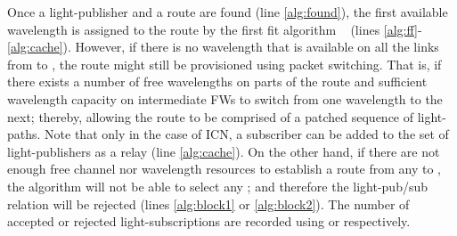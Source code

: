 \documentclass[journal]{IEEEtran}
\begin{document}
 Once a light-publisher  and a route  are found (line \ref{alg:found}), the first available wavelength is assigned to the route by the first fit algorithm ~\cite{raj:alloptic} (lines \ref{alg:ff}-\ref{alg:cache}).
 However, if there is no wavelength that is available on all the links from  to , the route might still be provisioned using packet switching. 
That is, if there exists a number of free wavelengths on parts of the route and sufficient wavelength capacity on intermediate FWs to switch from one wavelength to the next; thereby, allowing the route to be comprised of a patched sequence of light-paths. Note that only in the case of ICN, a subscriber can be added to the set of light-publishers as a relay (line \ref{alg:cache}). 
 On the other hand, if there are not enough free channel nor
 wavelength resources to establish a route from any  to ,
 the algorithm will not be able to select any ; and
 therefore the light-pub/sub relation will be rejected (lines
 \ref{alg:block1} or \ref{alg:block2}). The number of accepted or
 rejected light-subscriptions are recorded using  or  respectively.
\begin{algorithm}[t]
\caption{}
\label{alg:icn_maxdeg}
\begin{algorithmic}[1]
\STATE 
\STATE 
\STATE 
	\FORALL {} \label{alg:foralldelta}
		\FORALL{} \label{alg:forallsigma}
		\STATE  
		 \label{alg:forallrho}
			\STATE
			\STATE \label{alg:pcost}
			\STATE\label{alg:dim}
			\STATE  \label{alg:dij}
			\STATE
			\IF{}
				\STATE
			\ENDIF
		\ENDFOR\label{alg:endforallrho}
		\IF{} \label{alg:found}
				\STATE  \label{alg:ff}
				\IF{}
					\FORALL {} \label{alg:pktst}
						\STATE \label{alg:update}
						\STATE \label{alg:lcost}
						\STATE
                                                
                                                \STATE 
					\ENDFOR
					\STATE
          \STATE \lIf{} 
							{
								 
							} \label{alg:cache}
				\ELSE
					\STATE \label{alg:block1}
				\ENDIF
			\ELSE
				\STATE \label{alg:block2}
			\ENDIF
		\ENDFOR
	\ENDFOR
\end{algorithmic}
\end{algorithm}
\end{document}
